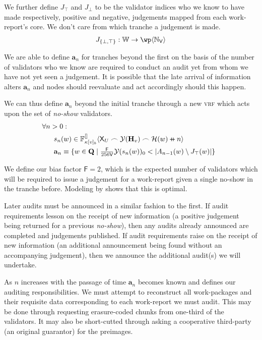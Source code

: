 We further define $J_\top$ and $J_\bot$ to be the validator indices who we know to have made respectively, positive and negative, judgements mapped from each work-report's core. We don't care from which tranche a judgement is made.
\begin{align}
  J_{\{\bot, \top\}}: \mathbb{W} \to \powset{\N_\mathsf{V}}
\end{align}

We are able to define $\mathbf{a}_n$ for tranches beyond the first on the basis of the number of validators who we know are required to conduct an audit yet from whom we have not yet seen a judgement. It is possible that the late arrival of information alters $\mathbf{a}_n$ and nodes should reevaluate and act accordingly should this happen.

We can thus define $\mathbf{a}_n$ beyond the initial tranche through a new \textsc{vrf} which acts upon the set of \emph{no-show} validators.
\begin{align}
  \nonumber&\!\!\!\!\!\!\!\!\forall n > 0:\\
  &\ s_n(w) \in \bandersig{\kappa[v]_b}{\mathsf{X}_U \concat \banderout{\mathbf{H}_v}\concat\mathcal{H}(w)\doubleplus n}{[]} \\
  &\ \mathbf{a}_n \equiv \{ w \in \mathbf{Q} \mid \textstyle\frac{\mathsf{F}}{256\mathsf{V}}\banderout{s_n(w)}_0 < |A_{n - 1}(w) \setminus J_\top(w)| \}\!\!\!\!
\end{align}

We define our bias factor $\mathsf{F} = 2$, which is the expected number of validators which will be required to issue a judgement for a work-report given a single no-show in the tranche before. Modeling by \cite{cryptoeprint:2024/961} shows that this is optimal.

Later audits must be announced in a similar fashion to the first. If audit requirements lesson on the receipt of new information (\ie a positive judgement being returned for a previous \emph{no-show}), then any audits already announced are completed and judgements published. If audit requirements raise on the receipt of new information (\ie an additional announcement being found without an accompanying judgement), then we announce the additional audit(s) we will undertake.

As $n$ increases with the passage of time $\mathbf{a}_n$ becomes known and defines our auditing responsibilities. We must attempt to reconstruct all work-packages and their requisite data corresponding to each work-report we must audit. This may be done through requesting erasure-coded chunks from one-third of the validators. It may also be short-cutted through asking a cooperative third-party (\eg an original guarantor) for the preimages.

